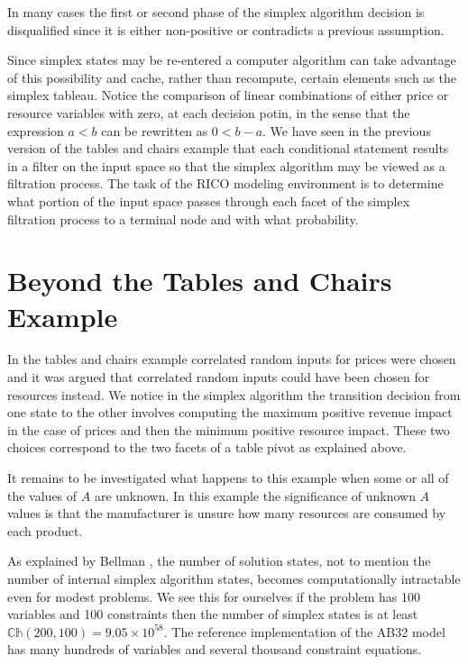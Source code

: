 
In many cases the first or second phase of the simplex algorithm decision is disqualified since it is either non-positive or contradicts a previous assumption. 

Since simplex states may be re-entered a computer algorithm can take advantage of this possibility and cache, rather than recompute, certain elements such as the simplex tableau. Notice the comparison of linear combinations of either price or resource variables with zero, at each decision potin, in the sense that the expression $a < b$ can be rewritten as $0 < b - a$. We have seen in the previous version of the tables and chairs example that each conditional statement results in a filter on the input space so that the simplex algorithm may be viewed as a filtration process. The task of the RICO modeling environment is to determine what portion of the input space passes through each facet of the simplex filtration process to a terminal node and with what probability.

\section{Beyond the Tables and Chairs Example}

In the tables and chairs example correlated random inputs for prices were chosen and it was argued that correlated random inputs could have been chosen for resources instead. We notice in the simplex algorithm the transition decision from one state to the other involves computing the maximum positive revenue impact in the case of prices and then the minimum positive resource impact. These two choices correspond to the two facets of a table pivot as explained above. 

It remains to be investigated what happens to this example when some or all of the values of $A$ are unknown. In this example the significance of unknown $A$ values is that the manufacturer is unsure how many resources are consumed by each product.

As explained by Bellman \cite{bellman03}, the number of solution states, not to mention the number of internal simplex algorithm states, becomes computationally intractable even for modest problems. We see this for ourselves if the problem has 100 variables and 100 constraints then the number of simplex states is at least $\mathbb{Ch}(200,100) = 9.05\times10^{58}$. The reference implementation of the AB32 model has many hundreds of variables and several thousand constraint equations. 


